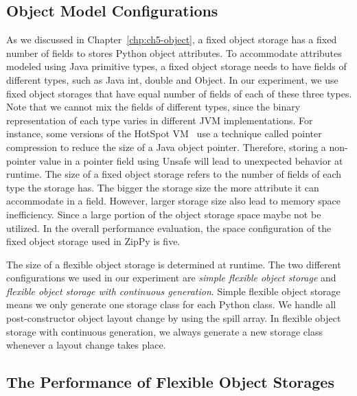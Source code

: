 \subsection{Object Model Configurations}

As we discussed in Chapter~\ref{chp:ch5-object}, a fixed object storage has a fixed number of fields to stores Python object attributes.
To accommodate attributes modeled using Java primitive types, a fixed object storage needs to have fields of different types, such as Java \textsf{int}, \textsf{double} and \textsf{Object}.
In our experiment, we use fixed object storages that have equal number of fields of each of these three types.
Note that we cannot mix the fields of different types, since the binary representation of each type varies in different JVM implementations.
For instance, some versions of the HotSpot VM~\cite{hotspot} use a technique called pointer compression to reduce the size of a Java object pointer.
Therefore, storing a non-pointer value in a pointer field using \textsf{Unsafe} will lead to unexpected behavior at runtime.
The size of a fixed object storage refers to the number of fields of each type the storage has.
The bigger the storage size the more attribute it can accommodate in a field.
However, larger storage size also lead to memory space inefficiency.
Since a large portion of the object storage space maybe not be utilized.
In the overall performance evaluation, the space configuration of the fixed object storage used in ZipPy is five.

The size of a flexible object storage is determined at runtime.
The two different configurations we used in our experiment are \emph{simple flexible object storage} and \emph{flexible object storage with continuous generation}.
Simple flexible object storage means we only generate one storage class for each Python class.
We handle all post-constructor object layout change by using the spill array.
In flexible object storage with continuous generation, we always generate a new storage class whenever a layout change takes place.

\subsection{The Performance of Flexible Object Storages}

